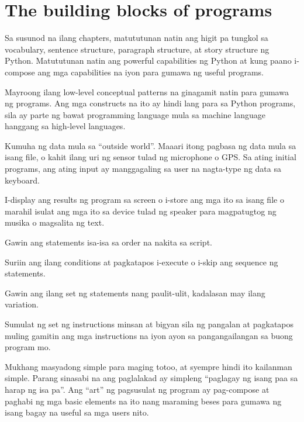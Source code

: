 \documentclass[10pt,]{book}
\providecommand{\tightlist}{%
  \setlength{\itemsep}{0pt}\setlength{\parskip}{0pt}}
\begin{document}
\section{The building blocks of
programs}\label{the-building-blocks-of-programs}

Sa susunod na ilang chapters, matututunan natin ang higit pa tungkol sa
vocabulary, sentence structure, paragraph structure, at story structure
ng Python. Matututunan natin ang powerful capabilities ng Python at kung
paano i-compose ang mga capabilities na iyon para gumawa ng useful
programs.

Mayroong ilang low-level conceptual patterns na ginagamit natin para
gumawa ng programs. Ang mga constructs na ito ay hindi lang para sa
Python programs, sila ay parte ng bawat programming language mula sa
machine language hanggang sa high-level languages.

\begin{description}
\tightlist
\item[input]
Kumuha ng data mula sa ``outside world''. Maaari itong pagbasa ng data
mula sa isang file, o kahit ilang uri ng sensor tulad ng microphone o
GPS. Sa ating initial programs, ang ating input ay manggagaling sa user
na nagta-type ng data sa keyboard.
\item[output]
I-display ang results ng program sa screen o i-store ang mga ito sa
isang file o marahil isulat ang mga ito sa device tulad ng speaker para
magpatugtog ng musika o magsalita ng text.
\item[sequential execution]
Gawin ang statements isa-isa sa order na nakita sa script.
\item[conditional execution]
Suriin ang ilang conditions at pagkatapos i-execute o i-skip ang
sequence ng statements.
\item[repeated execution]
Gawin ang ilang set ng statements nang paulit-ulit, kadalasan may ilang
variation.
\item[reuse]
Sumulat ng set ng instructions minsan at bigyan sila ng pangalan at
pagkatapos muling gamitin ang mga instructions na iyon ayon sa
pangangailangan sa buong program mo.
\end{description}

Mukhang masyadong simple para maging totoo, at syempre hindi ito
kailanman simple. Parang sinasabi na ang paglalakad ay simpleng
``paglagay ng isang paa sa harap ng isa pa''. Ang ``art'' ng pagsusulat
ng program ay pag-compose at paghabi ng mga basic elements na ito nang
maraming beses para gumawa ng isang bagay na useful sa mga users nito.
\end{document}
